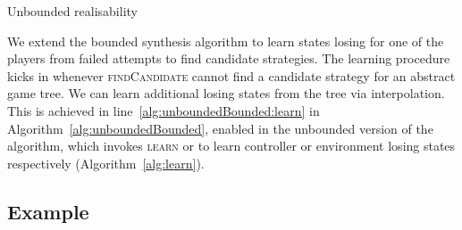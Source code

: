 \begin{algorithm}
    \caption{Unbounded realisability}
    \label{alg:unboundedBounded}
\end{algorithm}




We extend the bounded synthesis algorithm to learn states losing for one of the players from failed attempts to find candidate strategies.  The learning procedure kicks in whenever \textsc{findCandidate} cannot find a candidate strategy for an abstract game tree. We can learn additional losing states from the tree via interpolation.  This is achieved in line~\ref{alg:unboundedBounded:learn} in Algorithm~\ref{alg:unboundedBounded}, enabled in the unbounded version of the algorithm, which invokes \textsc{learn} or \textsc{} to learn controller or environment losing states respectively (Algorithm~\ref{alg:learn}).  




\subsection{Example}


